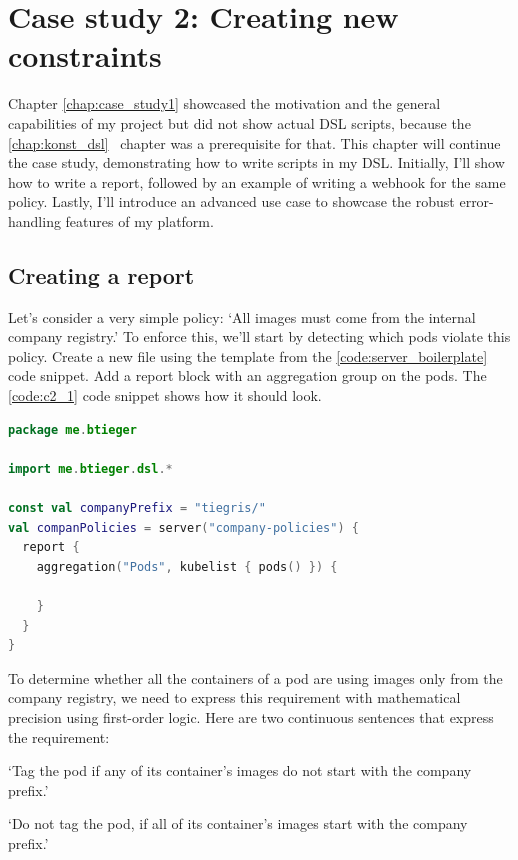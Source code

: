 \chapter{Case study 2: Creating new constraints}
\label{chap:case_study2}

Chapter \ref{chap:case_study1} showcased the motivation and the general capabilities of my project but did not show actual DSL scripts, because the \ref{chap:konst_dsl}~ chapter was a prerequisite for that. This chapter will continue the case study, demonstrating how to write scripts in my DSL. Initially, I'll show how to write a report, followed by an example of writing a webhook for the same policy. Lastly, I'll introduce an advanced use case to showcase the robust error-handling features of my platform.

\section{Creating a report}

Let's consider a very simple policy: `All images must come from the internal company registry.' To enforce this, we'll start by detecting which pods violate this policy. Create a new file using the template from the \ref{code:server_boilerplate} code snippet. Add a report block with an aggregation group on the pods. The \ref{code:c2_1} code snippet shows how it should look.

\begin{minipage}{\linewidth}
\begin{lstlisting}[caption={Report skeleton},language=Kotlin,label=code:c2_1]
package me.btieger

import me.btieger.dsl.*

const val companyPrefix = "tiegris/"
val companPolicies = server("company-policies") {
  report {
    aggregation("Pods", kubelist { pods() }) {
  
    }
  }
}
\end{lstlisting}
\end{minipage}

To determine whether all the containers of a pod are using images only from the company registry, we need to express this requirement with mathematical precision using first-order logic. Here are two continuous sentences that express the requirement:

`Tag the pod if any of its container's images do not start with the company prefix.'

`Do not tag the pod, if all of its container's images start with the company prefix.'

